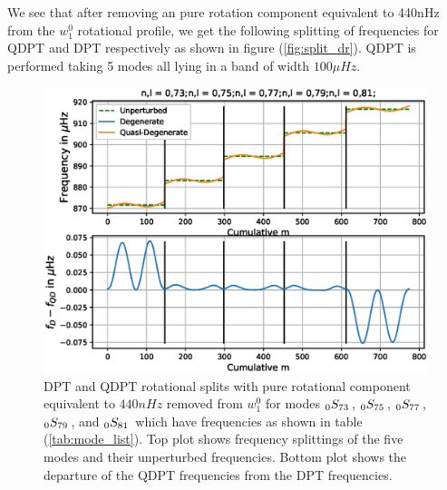 We see that after removing an pure rotation component equivalent to 440nHz from the $w_1^0$ rotational profile, we get the following splitting of frequencies for QDPT and DPT respectively as shown in figure (\ref{fig:split_dr}). QDPT is performed taking 5 modes all lying in a band of width $100\mu Hz$.
\begin{figure}[h!]
\includegraphics[scale=0.8,center]{Chapter4/figs/dr_split_rm}
\caption{DPT and QDPT rotational splits with pure rotational component equivalent to $440 nHz$ removed from $w_1^0$ for modes $_{0}S_{73}\,$, $_{0}S_{75}\,$, $_{0}S_{77}\,$, $_{0}S_{79}\,$, and $_{0}S_{81}\,$ which have frequencies as shown in table (\ref{tab:mode_list}). Top plot shows frequency splittings of the five modes and their unperturbed frequencies. Bottom plot shows the departure of the QDPT frequencies from the DPT frequencies.}
\label{fig:split_dr_rm}
\end{figure}


